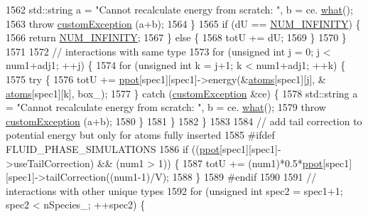 \begin{DoxyCode}
1562                 std::string a = \textcolor{stringliteral}{"Cannot recalculate energy from scratch: "}, b = ce.
      \hyperlink{classcustom_exception_aeb6ab5848b038adfc68fde86a512f691}{what}();
1563                 \textcolor{keywordflow}{throw} \hyperlink{classcustom_exception}{customException} (a+b);
1564             \}
1565             \textcolor{keywordflow}{if} (dU == \hyperlink{potentials_8h_ab94ab1d09e2291d03fe92a0e24a9d33b}{NUM\_INFINITY}) \{
1566                 \textcolor{keywordflow}{return} \hyperlink{potentials_8h_ab94ab1d09e2291d03fe92a0e24a9d33b}{NUM\_INFINITY};
1567             \} \textcolor{keywordflow}{else} \{
1568                 totU += dU;
1569             \}
1570         \}
1571 
1572         \textcolor{comment}{// interactions with same type}
1573         \textcolor{keywordflow}{for} (\textcolor{keywordtype}{unsigned} \textcolor{keywordtype}{int} j = 0; j < num1+adj1; ++j) \{
1574             \textcolor{keywordflow}{for} (\textcolor{keywordtype}{unsigned} \textcolor{keywordtype}{int} k = j+1; k < num1+adj1; ++k) \{
1575                 \textcolor{keywordflow}{try} \{
1576                     totU += \hyperlink{classsim_system_ad2e290b5963f132e6a3a56cee35c8e9f}{ppot}[spec1][spec1]->energy(&\hyperlink{classsim_system_a90421b19082f7fb8fc23b7264b1161e4}{atoms}[spec1][j], &
      \hyperlink{classsim_system_a90421b19082f7fb8fc23b7264b1161e4}{atoms}[spec1][k], box\_);
1577                 \} \textcolor{keywordflow}{catch} (\hyperlink{classcustom_exception}{customException} &ce) \{
1578                     std::string a = \textcolor{stringliteral}{"Cannot recalculate energy from scratch: "}, b = ce.
      \hyperlink{classcustom_exception_aeb6ab5848b038adfc68fde86a512f691}{what}();
1579                     \textcolor{keywordflow}{throw} \hyperlink{classcustom_exception}{customException} (a+b);
1580                 \}
1581             \}
1582         \}
1583 
1584         \textcolor{comment}{// add tail correction to potential energy but only for atoms fully inserted}
1585 \textcolor{preprocessor}{#ifdef FLUID\_PHASE\_SIMULATIONS}
1586 \textcolor{preprocessor}{}        \textcolor{keywordflow}{if} ((\hyperlink{classsim_system_ad2e290b5963f132e6a3a56cee35c8e9f}{ppot}[spec1][spec1]->useTailCorrection) && (num1 > 1)) \{
1587             totU += (num1)*0.5*\hyperlink{classsim_system_ad2e290b5963f132e6a3a56cee35c8e9f}{ppot}[spec1][spec1]->tailCorrection((num1-1)/V);
1588         \}
1589 \textcolor{preprocessor}{#endif}
1590 \textcolor{preprocessor}{}
1591         \textcolor{comment}{// interactions with other unique types}
1592         \textcolor{keywordflow}{for} (\textcolor{keywordtype}{unsigned} \textcolor{keywordtype}{int} spec2 = spec1+1; spec2 < nSpecies\_; ++spec2) \{

\end{DoxyCode}
